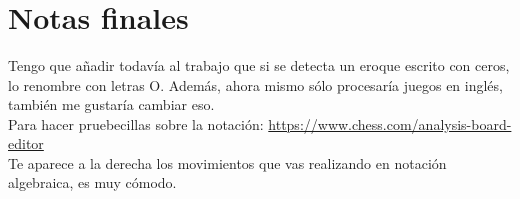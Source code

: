 \documentclass{article}
\begin{document}
\newgame
{} \\
\showboard

 \\
\showboard

 \\
\showboard

\section{Notas finales}

Tengo que añadir todavía al trabajo que si se detecta un eroque escrito con ceros, lo renombre con letras O. Además, ahora mismo sólo procesaría juegos en inglés, también me gustaría cambiar eso.  \\

Para hacer pruebecillas sobre la notación: \url{https://www.chess.com/analysis-board-editor} \\ Te aparece a la derecha los movimientos que vas realizando en notación algebraica, es muy cómodo. \\
\end{document}
